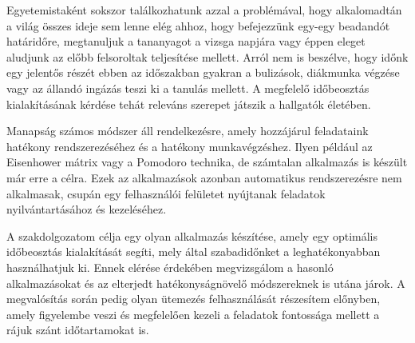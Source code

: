 
Egyetemistaként sokszor találkozhatunk azzal a problémával, hogy alkalomadtán a világ összes ideje sem lenne elég ahhoz, hogy befejezzünk egy-egy beadandót határidőre, megtanuljuk a tananyagot a vizsga napjára vagy éppen eleget aludjunk az előbb felsoroltak teljesítése mellett. Arról nem is beszélve, hogy időnk egy jelentős részét ebben az időszakban gyakran a bulizások, diákmunka végzése vagy az állandó ingázás teszi ki a tanulás mellett. A megfelelő időbeosztás kialakításának kérdése tehát releváns szerepet játszik a hallgatók életében.

Manapság számos módszer áll rendelkezésre, amely hozzájárul feladataink hatékony rendszerezéséhez és a hatékony munkavégzéshez. Ilyen például az Eisenhower mátrix vagy a Pomodoro technika, de számtalan alkalmazás is készült már erre a célra. Ezek az alkalmazások azonban automatikus rendszerezésre nem alkalmasak, csupán egy felhasználói felületet nyújtanak feladatok nyilvántartásához és kezeléséhez.

A szakdolgozatom célja egy olyan alkalmazás készítése, amely egy optimális időbeosztás kialakítását segíti, mely által szabadidőnket a leghatékonyabban használhatjuk ki. Ennek elérése érdekében megvizsgálom a hasonló alkalmazásokat és az elterjedt hatékonyságnövelő módszereknek is utána járok. A megvalósítás során pedig olyan ütemezés felhasználását részesítem előnyben, amely figyelembe veszi és megfelelően kezeli a feladatok fontossága mellett a rájuk szánt időtartamokat is.